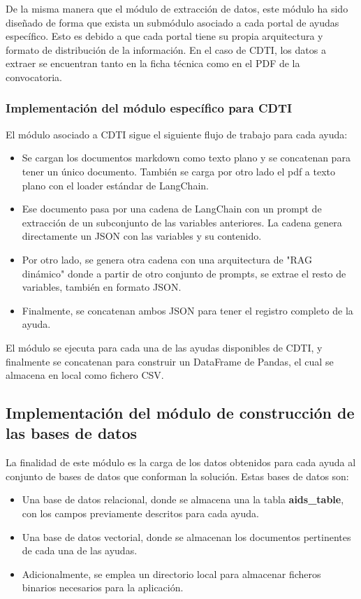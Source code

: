 De la misma manera que el módulo de extracción de datos, este módulo ha sido diseñado de forma que exista un submódulo asociado a cada portal de ayudas específico.
Esto es debido a que cada portal tiene su propia arquitectura y formato de distribución de la información. 
En el caso de CDTI, los datos a extraer se encuentran tanto en la ficha técnica como en el PDF de la convocatoria.


\subsubsection{Implementación del módulo específico para CDTI}

El módulo asociado a CDTI sigue el siguiente flujo de trabajo para cada ayuda:

\begin{itemize}
    \item Se cargan los documentos markdown como texto plano y se concatenan para tener un único documento. También se carga por otro lado el pdf a texto plano con el loader estándar de LangChain.
    \item Ese documento pasa por una cadena de LangChain con un prompt de extracción de un subconjunto de las variables anteriores. 
    La cadena genera directamente un JSON con las variables y su contenido.
    \item Por otro lado, se genera otra cadena con una arquitectura de "RAG dinámico" donde a partir de otro conjunto de prompts, se extrae el resto de variables, también en formato JSON. 
    \item Finalmente, se concatenan ambos JSON para tener el registro completo de la ayuda.
\end{itemize}

El módulo se ejecuta para cada una de las ayudas disponibles de CDTI, y finalmente se concatenan para construir un DataFrame de Pandas, el cual se almacena en local como fichero CSV.


\subsection{Implementación del módulo de construcción de las bases de datos}

La finalidad de este módulo es la carga de los datos obtenidos para cada ayuda al conjunto de bases de datos que conforman la solución.
Estas bases de datos son:

\begin{itemize}
    \item Una base de datos relacional, donde se almacena una la tabla \textbf{aids\_table}, con los campos previamente descritos para cada ayuda.
    \item Una base de datos vectorial, donde se almacenan los documentos pertinentes de cada una de las ayudas.
    \item Adicionalmente, se emplea un directorio local para almacenar ficheros binarios necesarios para la aplicación.
\end{itemize}

